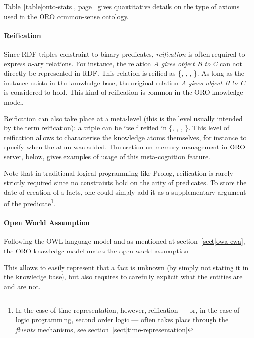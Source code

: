 Table~\ref{table|onto-stats}, page~\pageref{table|onto-stats} gives
quantitative details on the type of axioms used in the ORO common-sense
ontology.

\paragraph{Reification} Since RDF triples constraint to binary predicates,
\emph{reification} is often required to express $n$-ary relations. For
instance, the relation \emph{A gives object B to C} can not directly be
represented in RDF. This relation is reified as \{,
, , \}. As
long as the instance  exists in the knowledge base, the original
relation \emph{A gives object B to C} is considered to hold. This kind of
reification is common in the ORO knowledge model.

Reification can also take place at a meta-level (this is the level usually
intended by the term reification): a triple  can
be itself reified in \{, , , \}.
This level of reification allows to characterise the knowledge atoms
themselves, for instance to specify when the atom was added. The section on
memory management in ORO server, below, gives examples of usage of this
meta-cognition feature.

Note that in traditional logical programming like Prolog, reification is rarely
strictly required since no constraints hold on the arity of predicates. To
store the date of creation of a facts, one could simply add it as a
supplementary argument of the predicate\footnote{In the case of time
representation, however, reification --- or, in the case of logic programming,
second order logic --- often takes place through the \emph{fluents} mechanisms,
see section~\ref{sect|time-representation}}.

\paragraph{Open World Assumption}

Following the OWL language model and as mentioned at
section~\ref{sect|owa-cwa}, the ORO knowledge model makes the open world
assumption.

This allows to easily represent that a fact is unknown (by simply not stating
it in the knowledge base), but also requires to carefully explicit what the
entities are and are not.

